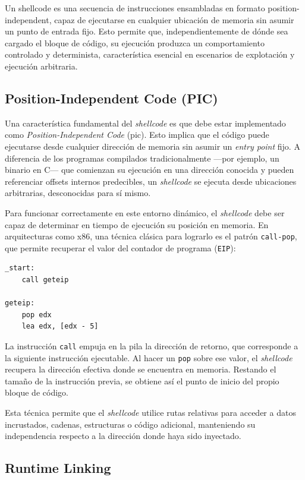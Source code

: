 Un shellcode es una secuencia de instrucciones ensambladas en formato position-independent, capaz de ejecutarse en cualquier ubicación de memoria sin asumir un punto de entrada fijo. Esto permite que, independientemente de dónde sea cargado el bloque de código, su ejecución produzca un comportamiento controlado y determinista, característica esencial en escenarios de explotación y ejecución arbitraria.

\subsection{Position-Independent Code (PIC)}

Una característica fundamental del \textit{shellcode} es que debe estar implementado como \textit{Position-Independent Code} (\acrshort{pic}). Esto implica que el código puede ejecutarse desde cualquier dirección de memoria sin asumir un \textit{entry point} fijo. A diferencia de los programas compilados tradicionalmente —por ejemplo, un binario en C— que comienzan su ejecución en una dirección conocida y pueden referenciar offsets internos predecibles, un \textit{shellcode} se ejecuta desde ubicaciones arbitrarias, desconocidas para sí mismo.

Para funcionar correctamente en este entorno dinámico, el \textit{shellcode} debe ser capaz de determinar en tiempo de ejecución su posición en memoria. En arquitecturas como x86, una técnica clásica para lograrlo es el patrón \texttt{call-pop}, que permite recuperar el valor del contador de programa (\texttt{EIP}):

\begin{verbatim}
_start:
    call geteip

geteip:
    pop edx
    lea edx, [edx - 5]
\end{verbatim}

La instrucción \texttt{call} empuja en la pila la dirección de retorno, que corresponde a la siguiente instrucción ejecutable. Al hacer un \texttt{pop} sobre ese valor, el \textit{shellcode} recupera la dirección efectiva donde se encuentra en memoria. Restando el tamaño de la instrucción previa, se obtiene así el punto de inicio del propio bloque de código.  

Esta técnica permite que el \textit{shellcode} utilice rutas relativas para acceder a datos incrustados, cadenas, estructuras o código adicional, manteniendo su independencia respecto a la dirección donde haya sido inyectado.


\subsection{Runtime Linking}

